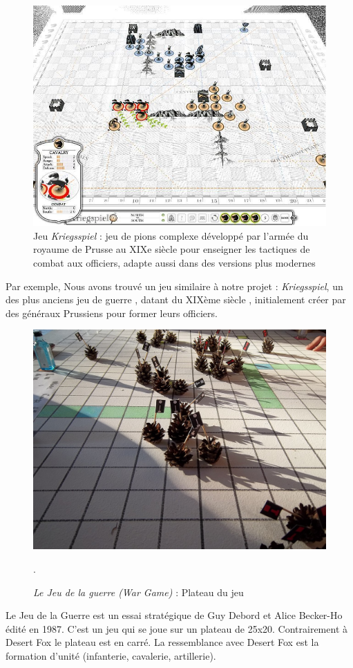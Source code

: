 \begin{figure}[H]
\centering
\includegraphics[scale=0.5]{data/kriegspiel.jpeg}
\caption{Jeu \textit{Kriegsspiel} : jeu de pions complexe développé par l'armée du royaume de Prusse au XIXe siècle pour enseigner les tactiques de combat aux officiers, adapte aussi dans des versions plus modernes \cite{livermore1879american}}
\end{figure}

Par exemple, Nous avons trouvé un jeu similaire à notre projet : \textit{Kriegsspiel}, un des plus anciens jeu de guerre , datant du XIXème siècle , initialement créer par des généraux Prussiens pour former leurs officiers.

\begin{figure}[H]
\centering
\includegraphics[scale=0.2]{data/Cavalry_at_dusk,.jpg}
\caption{\textit{Le Jeu de la guerre (War Game)} : Plateau du jeu}.
\end{figure}

Le Jeu de la Guerre \cite{frwiki:189457170} est un essai stratégique de Guy Debord et Alice Becker-Ho édité en 1987.
C'est un jeu qui se joue sur un plateau de 25x20. Contrairement à Desert Fox le plateau est en carré. La ressemblance avec Desert Fox est la formation d'unité (infanterie, cavalerie, artillerie).

